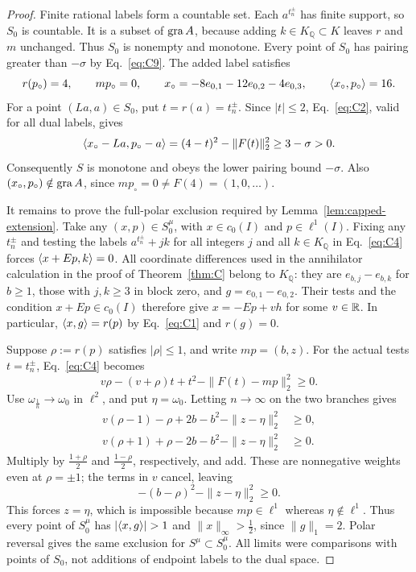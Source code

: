 \begin{proof}
Finite rational labels form a countable set. Each $a^{t_n^\pm}$ has
finite support, so $S_0$ is countable. It is a subset of $\operatorname{gra} A$,
because adding $k\in K_{\mathbb Q}\subset K$ leaves $r$ and $m$
unchanged. Thus $S_0$ is nonempty and monotone. Every point of $S_0$ has
pairing greater than $-\sigma$ by Eq.~\eqref{eq:C9}.
The added label satisfies
\[
r(p_\circ)=4,\qquad mp_\circ=0,\qquad
x_\circ=-8e_{0,1}-12e_{0,2}-4e_{0,3},\qquad
\langle x_\circ,p_\circ\rangle=16.
\]
For a point $(La,a)\in S_0$, put $t=r(a)=t_n^\pm$. Since $|t|\le2$,
Eq.~\eqref{eq:C2}, valid for all dual labels, gives
\[
\langle x_\circ-La,p_\circ-a\rangle
=(4-t)^2-\|F(t)\|_2^2\ge3-\sigma>0.
\]
Consequently $S$ is monotone and obeys the lower pairing bound
$-\sigma$. Also $(x_\circ,p_\circ)\notin\operatorname{gra} A$, since
$mp_\circ=0\ne F(4)=(1,0,\ldots)$.

It remains to prove the full-polar exclusion required by
Lemma~\ref{lem:capped-extension}. Take any
$(x,p)\in S_0^\mu$, with $x\in c_0(I)$ and $p\in\ell^1(I)$.
Fixing any $t_n^\pm$ and testing the labels
$a^{t_n^\pm}+j k$ for all integers $j$ and all $k\in K_{\mathbb Q}$
in Eq.~\eqref{eq:C4} forces $\langle x+Ep,k\rangle=0$.
All coordinate differences used in the annihilator calculation in the
proof of Theorem~\ref{thm:C} belong to $K_{\mathbb Q}$: they are
$e_{b,j}-e_{b,k}$ for $b\ge1$, those with $j,k\ge3$ in block zero,
and $g=e_{0,1}-e_{0,2}$. Their tests and the condition $x+Ep\in c_0(I)$
therefore give $x=-Ep+v h$ for some $v\in\mathbb R$.
In particular, $\langle x,g\rangle=r(p)$ by Eq.~\eqref{eq:C1} and $r(g)=0$.

Suppose $\rho:=r(p)$ satisfies $|\rho|\le1$, and write $mp=(b,z)$.
For the actual tests $t=t_n^\pm$, Eq.~\eqref{eq:C4} becomes
\[
v\rho-(v+\rho)t+t^2-\|F(t)-mp\|_2^2\ge0.
\]
Use $\omega_{\frac{1}{n}}\to\omega_0$ in $\ell^2$, and put
$\eta=\omega_0$. Letting $n\to\infty$ on the two branches gives
\begin{align*}
v(\rho-1)-\rho+2b-b^2-\|z-\eta\|_2^2&\ge0,\\
v(\rho+1)+\rho-2b-b^2-\|z-\eta\|_2^2&\ge0.
\end{align*}
Multiply by $\frac{1+\rho}{2}$ and $\frac{1-\rho}{2}$, respectively, and add.
These are nonnegative weights even at $\rho=\pm1$; the terms in $v$
cancel, leaving
\[
-(b-\rho)^2-\|z-\eta\|_2^2\ge0.
\]
This forces $z=\eta$, which is impossible because $mp\in\ell^1$
whereas $\eta\notin\ell^1$. Thus every point of $S_0^\mu$ has
$|\pair{x}{g}|>1$ and $\|x\|_\infty>\frac{1}{2}$, since $\|g\|_1=2$.
Polar reversal gives the same exclusion for $S^\mu\subset S_0^\mu$.
All limits were comparisons with points of $S_0$, not additions of
endpoint labels to the dual space.


\end{proof}
